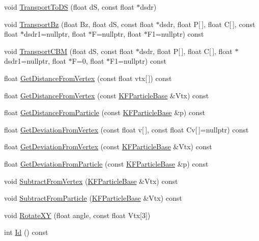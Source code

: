 \begin{DoxyCompactItemize}
\item 
void \hyperlink{classKFParticleBase_a0048b51a7253c7ac3af2c3c539f57cc7}{Transport\+To\+DS} (float dS, const float $\ast$dsdr)
\item 
void \hyperlink{classKFParticleBase_a88bf4e09f3a56166783df8aea759f091}{Transport\+Bz} (float Bz, float dS, const float $\ast$dsdr, float P\mbox{[}$\,$\mbox{]}, float C\mbox{[}$\,$\mbox{]}, const float $\ast$dsdr1=nullptr, float $\ast$F=nullptr, float $\ast$F1=nullptr) const 
\item 
void \hyperlink{classKFParticleBase_a36d1291524f0ac5f03c5992d9a8423fb}{Transport\+C\+BM} (float dS, const float $\ast$dsdr, float P\mbox{[}$\,$\mbox{]}, float C\mbox{[}$\,$\mbox{]}, float $\ast$dsdr1=nullptr, float $\ast$F=0, float $\ast$F1=nullptr) const 
\item 
float \hyperlink{classKFParticleBase_a0b0b6dadfff81ec0859e8bb5a70855de}{Get\+Distance\+From\+Vertex} (const float vtx\mbox{[}$\,$\mbox{]}) const 
\item 
float \hyperlink{classKFParticleBase_afd262e70a5886304084ac211e6e0a93e}{Get\+Distance\+From\+Vertex} (const \hyperlink{classKFParticleBase}{K\+F\+Particle\+Base} \&Vtx) const 
\item 
float \hyperlink{classKFParticleBase_a4f0714900bbae86b5dcc9459c08a6bd0}{Get\+Distance\+From\+Particle} (const \hyperlink{classKFParticleBase}{K\+F\+Particle\+Base} \&p) const 
\item 
float \hyperlink{classKFParticleBase_a163498359371fb50f40fa168d221f09a}{Get\+Deviation\+From\+Vertex} (const float v\mbox{[}$\,$\mbox{]}, const float Cv\mbox{[}$\,$\mbox{]}=nullptr) const 
\item 
float \hyperlink{classKFParticleBase_af96a10f763186cc66c6a298cdc34f226}{Get\+Deviation\+From\+Vertex} (const \hyperlink{classKFParticleBase}{K\+F\+Particle\+Base} \&Vtx) const 
\item 
float \hyperlink{classKFParticleBase_a1b27163a487575680c1d0bb54e30edae}{Get\+Deviation\+From\+Particle} (const \hyperlink{classKFParticleBase}{K\+F\+Particle\+Base} \&p) const 
\item 
void \hyperlink{classKFParticleBase_a61b2ddef3be58d0a9199371ef818abec}{Subtract\+From\+Vertex} (\hyperlink{classKFParticleBase}{K\+F\+Particle\+Base} \&Vtx) const 
\item 
void \hyperlink{classKFParticleBase_a870c6ea92e96afd7ad29fc2a4114eea2}{Subtract\+From\+Particle} (\hyperlink{classKFParticleBase}{K\+F\+Particle\+Base} \&Vtx) const 
\item 
void \hyperlink{classKFParticleBase_a5157686e0eeca2064da38b2cd4f225ed}{Rotate\+XY} (float angle, const float Vtx\mbox{[}3\mbox{]})
\item 
int \hyperlink{classKFParticleBase_a625f1f975f4a106df47ec12710e82f7b}{Id} () const \hypertarget{classKFParticleBase_a625f1f975f4a106df47ec12710e82f7b}{}\label{classKFParticleBase_a625f1f975f4a106df47ec12710e82f7b}


\end{DoxyCompactItemize}

